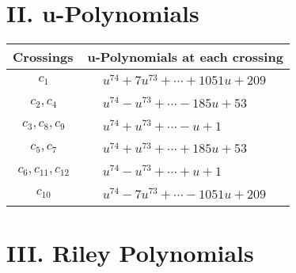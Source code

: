 \documentclass[1p]{elsarticle_modified}
\theoremstyle{definition}
\begin{document}
\newpage\renewcommand{\arraystretch}{1}
\centering \section*{ II. u-Polynomials}
\begin{tabular}{m{50pt}|m{274pt}}
Crossings & \hspace{64pt}u-Polynomials at each crossing \\
\hline $$\begin{aligned}c_{1}\end{aligned}$$&$\begin{aligned}
&u^{74}+7 u^{73}+\cdots+1051 u+209
\end{aligned}$\\
\hline $$\begin{aligned}c_{2},c_{4}\end{aligned}$$&$\begin{aligned}
&u^{74}- u^{73}+\cdots-185 u+53
\end{aligned}$\\
\hline $$\begin{aligned}c_{3},c_{8},c_{9}\end{aligned}$$&$\begin{aligned}
&u^{74}+u^{73}+\cdots- u+1
\end{aligned}$\\
\hline $$\begin{aligned}c_{5},c_{7}\end{aligned}$$&$\begin{aligned}
&u^{74}+u^{73}+\cdots+185 u+53
\end{aligned}$\\
\hline $$\begin{aligned}c_{6},c_{11},c_{12}\end{aligned}$$&$\begin{aligned}
&u^{74}- u^{73}+\cdots+u+1
\end{aligned}$\\
\hline $$\begin{aligned}c_{10}\end{aligned}$$&$\begin{aligned}
&u^{74}-7 u^{73}+\cdots-1051 u+209
\end{aligned}$\\
\hline
\end{tabular}\newpage\renewcommand{\arraystretch}{1}
\centering \section*{ III. Riley Polynomials}
\end{document}
